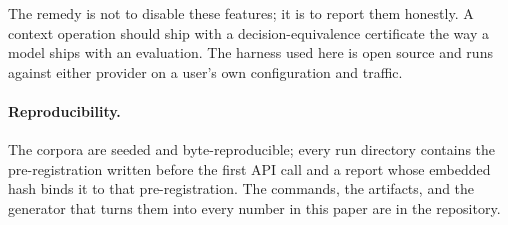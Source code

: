 \documentclass[11pt]{article}
\begin{document}
The remedy is not to disable these features; it is to report them honestly. A
context operation should ship with a decision-equivalence certificate the way a
model ships with an evaluation. The harness used here is open source and runs
against either provider on a user's own configuration and traffic.

\paragraph{Reproducibility.}
The corpora are seeded and byte-reproducible; every run directory contains the
pre-registration written before the first API call and a report whose embedded
hash binds it to that pre-registration. The commands, the artifacts, and the
generator that turns them into every number in this paper are in the repository.
\end{document}
